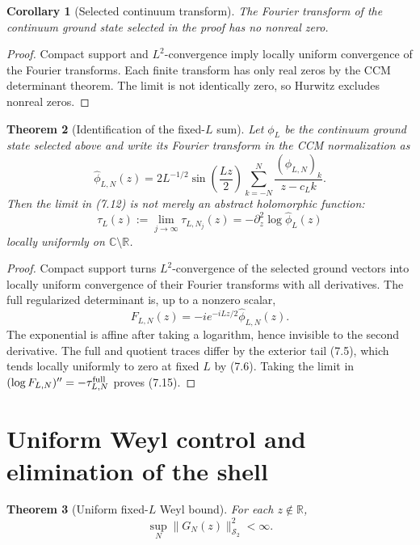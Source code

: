 \documentclass[11pt]{amsart}
\newtheorem{theorem}{Theorem}[section]
\newtheorem{corollary}[theorem]{Corollary}
\theoremstyle{definition}
\theoremstyle{remark}
\newcommand{\C}{\mathbb C}
\newcommand{\R}{\mathbb R}
\newcommand{\Schatten}{\mathcal S}
\begin{document}
\begin{corollary}[Selected continuum transform]
The Fourier transform of the continuum ground state selected in the proof
has no nonreal zero.
\end{corollary}

\begin{proof}
Compact support and \(L^2\)-convergence imply locally uniform convergence of
the Fourier transforms.  Each finite transform has only real zeros by the
CCM determinant theorem.  The limit is not identically zero, so Hurwitz
excludes nonreal zeros.
\end{proof}

\begin{theorem}[Identification of the fixed-\(L\) sum]
Let \(\phi_L\) be the continuum ground state selected above and write its
Fourier transform in the CCM normalization as
\[
 \widehat\phi_{L,N}(z)
 =2L^{-1/2}\sin\left(\frac{Lz}{2}\right)
   \sum_{k=-N}^{N}\frac{(\phi_{L,N})_k}{z-c_Lk}.
\tag{7.14}
\]
Then the limit in (7.12) is not merely an abstract holomorphic function:
\[
\boxed{
 \tau_L(z):=\lim_{j\to\infty}\tau_{L,N_j}(z)
 =-\partial_z^2\log\widehat\phi_L(z)}
\tag{7.15}
\]
locally uniformly on \(\C\setminus\R\).
\end{theorem}

\begin{proof}
Compact support turns \(L^2\)-convergence of the selected ground vectors
into locally uniform convergence of their Fourier transforms with all
derivatives.  The full regularized determinant is, up to a nonzero scalar,
\[
 F_{L,N}(z)=-ie^{-iLz/2}\widehat\phi_{L,N}(z).
\]
The exponential is affine after taking a logarithm, hence invisible to the
second derivative.  The full and quotient traces differ by the exterior
tail (7.5), which tends locally uniformly to zero at fixed \(L\) by (7.6).
Taking the limit in
\((\log F_{L,N})''=-\tau^{\rm full}_{L,N}\) proves (7.15).
\end{proof}

\section{Uniform Weyl control and elimination of the shell}
\label{sec:shell}

\begin{theorem}[Uniform fixed-\(L\) Weyl bound]
For each \(z\notin\R\),
\[
\boxed{\sup_N\|G_N(z)\|_{\Schatten_2}^2<\infty.}
\tag{8.1}
\]
\end{theorem}
\end{document}
